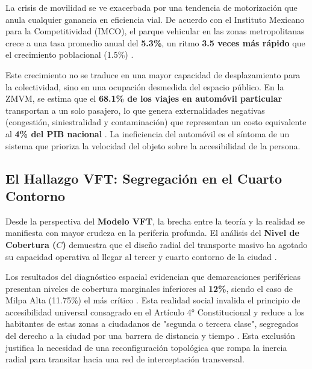 La crisis de movilidad se ve exacerbada por una tendencia de motorización que anula 
cualquier ganancia en eficiencia vial. De acuerdo con el Instituto Mexicano para la 
Competitividad (IMCO), el parque vehicular en las zonas metropolitanas crece a una 
tasa promedio anual del \textbf{5.3\%}, un ritmo \textbf{3.5 veces más rápido} que el 
crecimiento poblacional (1.5\%) \cite{Litman2021, batista2015}. 

Este crecimiento no se traduce en una mayor capacidad de desplazamiento para la colectividad, 
sino en una ocupación desmedida del espacio público. En la ZMVM, se estima que el 
\textbf{68.1\% de los viajes en automóvil particular} transportan a un solo pasajero, lo 
que genera externalidades negativas (congestión, siniestralidad y contaminación) que 
representan un costo equivalente al \textbf{4\% del PIB nacional} 
\cite{IMCO2019Doc, RedalycPeaton}. La ineficiencia del automóvil 
es el síntoma de un sistema que prioriza la velocidad del objeto sobre la accesibilidad 
de la persona.

\subsection{El Hallazgo VFT: Segregación en el Cuarto Contorno}

Desde la perspectiva del \textbf{Modelo VFT}, la brecha entre la teoría y la realidad 
se manifiesta con mayor crudeza en la periferia profunda. El análisis del 
\textbf{Nivel de Cobertura ($C$)} demuestra que el diseño radial del transporte 
masivo ha agotado su capacidad operativa al llegar al tercer y cuarto contorno 
de la ciudad \cite{SEDATU2023, Garibaldi2024VFT}. 

Los resultados del diagnóstico espacial evidencian que demarcaciones periféricas 
presentan niveles de cobertura marginales inferiores al \textbf{12\%}, siendo el caso 
de Milpa Alta (11.75\%) el más crítico \cite{Garibaldi2024VFT}. 
Esta realidad social invalida el principio de accesibilidad universal consagrado en el 
Artículo 4° Constitucional y reduce a los habitantes de estas zonas a ciudadanos de 
"segunda o tercera clase", segregados del derecho a la ciudad por una barrera de distancia 
y tiempo \cite{rendon2009ciudadanos}. Esta exclusión justifica la necesidad de una 
reconfiguración topológica que rompa la inercia radial para transitar hacia una red de 
interceptación transversal.
